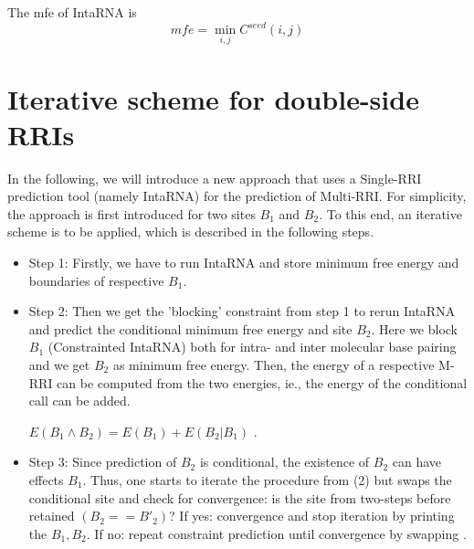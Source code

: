 \documentclass[twoside,a4paper]{report}
\numberwithin{equation}{section}
\begin{document}
	The mfe of IntaRNA is\\
	
		
	\begin{equation*}
	mfe = \min_{i,j} C^{seed}(i,j)
	\end{equation*}
	
	
	\section{Iterative scheme for double-side RRIs}
	 In the following, we will introduce a new approach that uses a Single-RRI prediction tool (namely IntaRNA) for the prediction of Multi-RRI. For simplicity, the approach is first introduced for two sites $B_1$ and $B_2$. To this end, an iterative scheme is to be applied, which is described in the following steps.
	
	 
	 \begin{itemize}
	 	 
	
	 \item Step 1: Firstly, we have to run IntaRNA and store minimum free energy and boundaries of respective $B_1$.
	 \item Step 2: Then we get the 'blocking' constraint from step 1 to rerun IntaRNA and predict the conditional minimum free energy and site $B_2$. Here we block $B_1$ (Constrainted IntaRNA) both for intra- and inter molecular base pairing and we get $B_2$ as minimum free energy. Then, the energy of a respective M-RRI can be computed from the two energies, ie., the energy of the conditional call can be added. \\
	 \begin{center}
	 	 $E(B_1 \land B_2) = E(B_1) + E(B_2 | B_1)$ .
	 \end{center}
	 
	 \item Step 3: Since prediction of $B_2$ is conditional, the existence of $B_2$ can have effects $B_1$. Thus, one starts to iterate the procedure from (2) but swaps the conditional site and check for convergence: is the site from two-steps before retained $(B_2 == B'_2)$? If yes: convergence and stop iteration by printing the  $B_1 , B_2$. If no: repeat constraint prediction until convergence by swapping .
	 
	  \end{itemize}
  
%  	
  
\end{document}
